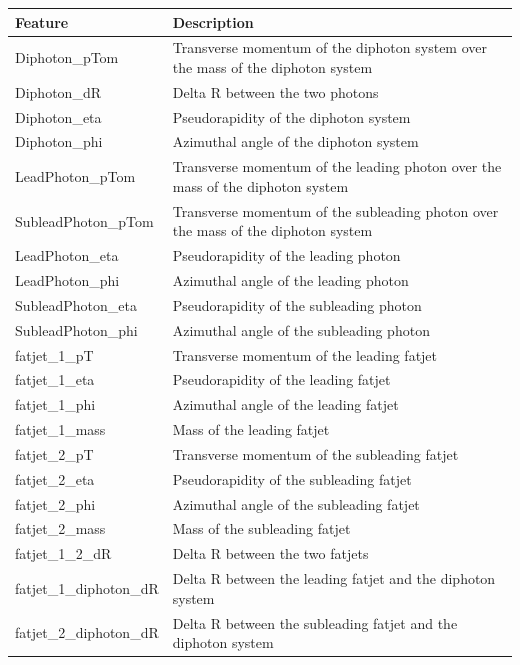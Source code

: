 \begin{table}[htbp!]
    \centering
    \begin{tabularx}{\textwidth}{|l|X|}
    \hline
    \textbf{Feature} & \textbf{Description} \\
    \hline
    Diphoton\_pTom & Transverse momentum of the diphoton system over the mass of the diphoton system \\
    Diphoton\_dR & Delta R between the two photons \\
    Diphoton\_eta & Pseudorapidity of the diphoton system \\
    Diphoton\_phi & Azimuthal angle of the diphoton system \\
    LeadPhoton\_pTom & Transverse momentum of the leading photon over the mass of the diphoton system \\
    SubleadPhoton\_pTom & Transverse momentum of the subleading photon over the mass of the diphoton system \\
    LeadPhoton\_eta & Pseudorapidity of the leading photon \\
    LeadPhoton\_phi & Azimuthal angle of the leading photon \\
    SubleadPhoton\_eta & Pseudorapidity of the subleading photon \\
    SubleadPhoton\_phi & Azimuthal angle of the subleading photon \\
    fatjet\_1\_pT & Transverse momentum of the leading fatjet \\
    fatjet\_1\_eta & Pseudorapidity of the leading fatjet \\
    fatjet\_1\_phi & Azimuthal angle of the leading fatjet \\
    fatjet\_1\_mass & Mass of the leading fatjet \\
    fatjet\_2\_pT & Transverse momentum of the subleading fatjet \\
    fatjet\_2\_eta & Pseudorapidity of the subleading fatjet \\
    fatjet\_2\_phi & Azimuthal angle of the subleading fatjet \\
    fatjet\_2\_mass & Mass of the subleading fatjet \\
    fatjet\_1\_2\_dR & Delta R between the two fatjets \\
    fatjet\_1\_diphoton\_dR & Delta R between the leading fatjet and the diphoton system \\
    fatjet\_2\_diphoton\_dR & Delta R between the subleading fatjet and the diphoton system \\

\end{tabularx}
\end{table}
